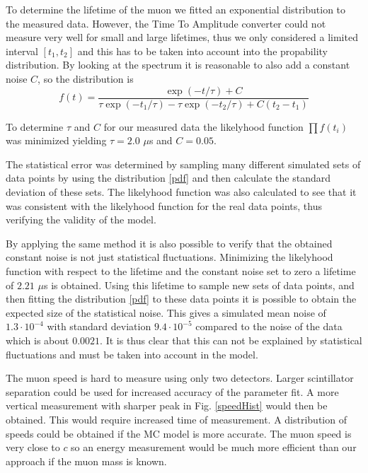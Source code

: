 \documentclass[10pt,twocolumn]{article}
\begin{document}
To determine the lifetime of the muon we fitted an exponential distribution to the measured data. However, the Time To Amplitude converter could not measure very well for small and large lifetimes, thus we only considered a limited interval $[t_1,t_2]$ and this has to be taken into account into the propability distribution. By looking at the spectrum it is reasonable to also add a constant noise $C$, so the distribution is
\begin{equation}
f(t)=\frac{\exp{(-t/\tau)}+C}{\tau\exp{(-t_1/\tau)}-\tau\exp{(-t_2/\tau)}+C(t_2-t_1)}\label{pdf}
\end{equation}

To determine $\tau$ and $C$ for our measured data the likelyhood function $\prod f(t_i)$ was minimized yielding $\tau=2.0$ $\mu$s and $C=0.05$. \newline

The statistical error was determined by sampling many different simulated sets of data points by using the distribution \eqref{pdf} and then calculate the standard deviation of these sets. The likelyhood function was also calculated to see that it was consistent with the likelyhood function for the real data points, thus verifying the validity of the model. \newline

By applying the same method it is also possible to verify that the obtained constant noise is not just statistical fluctuations. Minimizing the likelyhood function with respect to the lifetime and the constant noise set to zero a lifetime of $2.21$ $\mu$s is obtained. Using this lifetime to sample new sets of data points, and then fitting the distribution \eqref{pdf} to these data points it is possible to obtain the expected size of the statistical noise. This gives a simulated mean noise of $1.3\cdot 10^{-4}$ with standard deviation $9.4\cdot 10^{-5}$ compared to the noise of the data which is about $0.0021$. It is thus clear that this can not be explained by statistical fluctuations and must be taken into account in the model.

The muon speed is hard to measure using only two detectors. Larger scintillator separation could be used for increased accuracy of the parameter fit. A more vertical measurement with sharper peak in Fig. \ref{speedHist} would then be obtained. This would require increased time of measurement. A distribution of speeds could be obtained if the MC model is more accurate. The muon speed is very close to $c$ so an energy measurement would be much more efficient than our approach if the muon mass is known.\\
\end{document}
